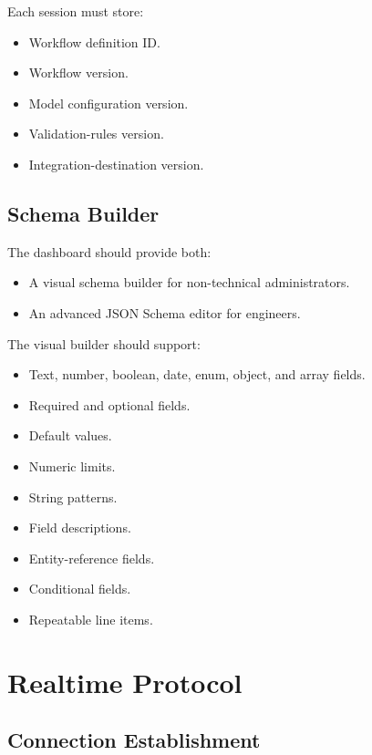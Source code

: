 \documentclass[11pt,a4paper]{article}
\begin{document}
Each session must store:

\begin{itemize}
\item Workflow definition ID.
\item Workflow version.
\item Model configuration version.
\item Validation-rules version.
\item Integration-destination version.
\end{itemize}

\subsection{Schema Builder}

The dashboard should provide both:

\begin{itemize}
\item A visual schema builder for non-technical administrators.
\item An advanced JSON Schema editor for engineers.
\end{itemize}

The visual builder should support:

\begin{itemize}
\item Text, number, boolean, date, enum, object, and array fields.
\item Required and optional fields.
\item Default values.
\item Numeric limits.
\item String patterns.
\item Field descriptions.
\item Entity-reference fields.
\item Conditional fields.
\item Repeatable line items.
\end{itemize}

\section{Realtime Protocol}

\subsection{Connection Establishment}
\end{document}

